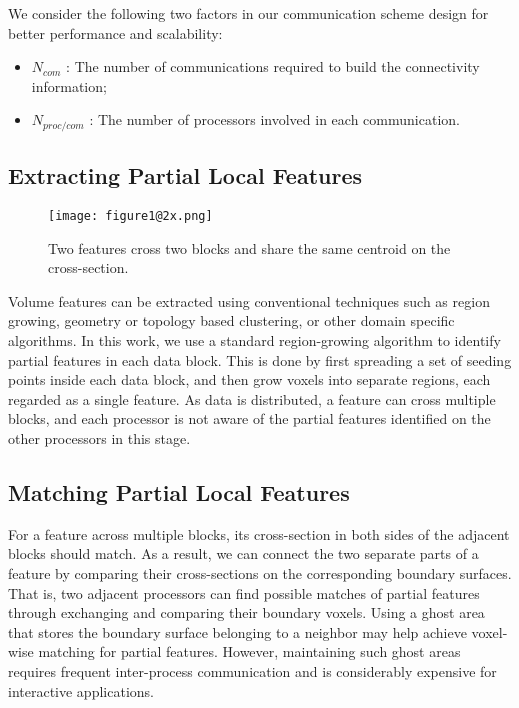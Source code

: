 We consider the following two factors in our communication scheme design for better performance and scalability:

\begin{itemize}
  \item $N_{com}$ : The number of communications required to build the connectivity information;
  \item $N_{proc/com}$ : The number of processors involved in each communication.
\end{itemize}


\subsection{Extracting Partial Local Features}

\begin{figure}[t]
	\centering
	\texttt{[image: figure1@2x.png]}
	\caption{Two features cross two blocks and share the same centroid on the cross-section.}
	\label{fig:special}
\end{figure}

Volume features can be extracted using conventional techniques such as region growing, geometry or topology based clustering, or other domain specific algorithms. In this work, we use a standard region-growing algorithm
\cite{Lohmann1998} to identify partial features in each data block. This is done by first spreading a set of seeding points inside each data block, and then grow voxels into separate regions, each regarded as a single feature. As data is distributed, a feature can cross multiple blocks, and each processor is not aware of the partial features identified on the other processors in this stage.

\subsection{Matching Partial Local Features}

For a feature across multiple blocks, its cross-section in both sides of the adjacent blocks should match. As a result, we can connect the two separate parts of a feature by comparing their cross-sections on the corresponding boundary surfaces. That is, two adjacent processors can find possible matches of partial features through exchanging and comparing their boundary voxels. Using a ghost area that stores the boundary surface belonging to a neighbor may help achieve voxel-wise matching for partial features. However, maintaining such ghost areas requires frequent inter-process communication and is considerably expensive for interactive applications.


